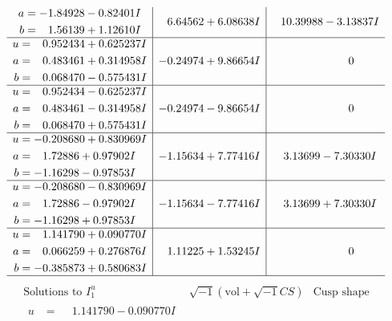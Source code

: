 \documentclass[1p]{elsarticle_modified}
\theoremstyle{definition}
\newcommand{\I}{\sqrt{-1}}
\begin{document}
$$\begin{array}{c|c|c}
\begin{aligned}
a &= -1.84928 - 0.82401 I \\
b &= \phantom{-}1.56139 + 1.12610 I\end{aligned}
 & \phantom{-}6.64562 + 6.08638 I & \phantom{-}10.39988 - 3.13837 I \\ \hline\begin{aligned}
u &= \phantom{-}0.952434 + 0.625237 I \\
a &= \phantom{-}0.483461 + 0.314958 I \\
b &= \phantom{-}0.068470 - 0.575431 I\end{aligned}
 & -0.24974 + 9.86654 I & \phantom{-0.000000 } 0 \\ \hline\begin{aligned}
u &= \phantom{-}0.952434 - 0.625237 I \\
a &= \phantom{-}0.483461 - 0.314958 I \\
b &= \phantom{-}0.068470 + 0.575431 I\end{aligned}
 & -0.24974 - 9.86654 I & \phantom{-0.000000 } 0 \\ \hline\begin{aligned}
u &= -0.208680 + 0.830969 I \\
a &= \phantom{-}1.72886 + 0.97902 I \\
b &= -1.16298 - 0.97853 I\end{aligned}
 & -1.15634 + 7.77416 I & \phantom{-}3.13699 - 7.30330 I \\ \hline\begin{aligned}
u &= -0.208680 - 0.830969 I \\
a &= \phantom{-}1.72886 - 0.97902 I \\
b &= -1.16298 + 0.97853 I\end{aligned}
 & -1.15634 - 7.77416 I & \phantom{-}3.13699 + 7.30330 I \\ \hline\begin{aligned}
u &= \phantom{-}1.141790 + 0.090770 I \\
a &= \phantom{-}0.066259 + 0.276876 I \\
b &= -0.385873 + 0.580683 I\end{aligned}
 & \phantom{-}1.11225 + 1.53245 I & \phantom{-0.000000 } 0\\
 \hline 
 \end{array}$$\newpage$$\begin{array}{c|c|c}  
\text{Solutions to }I^u_{1}& \I (\text{vol} + \sqrt{-1}CS) & \text{Cusp shape}\\
 \hline 
\begin{aligned}
u &= \phantom{-}1.141790 - 0.090770 I \\

\end{aligned}
\end{array}$$
\end{document}
